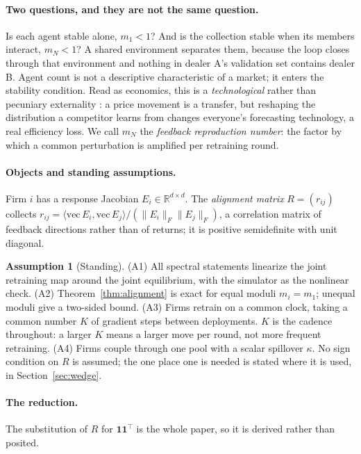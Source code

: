 \documentclass{article}
\theoremstyle{plain}
\theoremstyle{definition}
\newtheorem{assumption}{Assumption}
\newcommand{\mN}{m_N}
\begin{document}
\paragraph{Two questions, and they are not the same question.}
Is each agent stable alone, $m_1 < 1$? And is the collection stable when its members interact, $\mN < 1$? A shared environment separates them, because the loop closes through that environment and nothing in dealer A's validation set contains dealer B. Agent count is not a descriptive characteristic of a market; it enters the stability condition. Read as economics, this is a \emph{technological} rather than pecuniary externality \citep{buchanan1962}: a price movement is a transfer, but reshaping the distribution a competitor learns from changes everyone's forecasting technology, a real efficiency loss. We call $\mN$ the \emph{feedback reproduction number}: the factor by which a common perturbation is amplified per retraining round.

\paragraph{Objects and standing assumptions.}
Firm $i$ has a response Jacobian $E_i \in \mathbb{R}^{d\times d}$. The \emph{alignment matrix} $R = (r_{ij})$ collects $r_{ij} = \langle \mathrm{vec}\,E_i, \mathrm{vec}\,E_j\rangle / (\|E_i\|_F \|E_j\|_F)$, a correlation matrix of feedback directions rather than of returns; it is positive semidefinite with unit diagonal.

\begin{assumption}[Standing]
\label{ass:standing}
(A1) All spectral statements linearize the joint retraining map around the joint equilibrium, with the simulator as the nonlinear check. (A2) Theorem~\ref{thm:alignment} is exact for equal moduli $m_i = m_1$; unequal moduli give a two-sided bound. (A3) Firms retrain on a common clock, taking a common number $K$ of gradient steps between deployments. $K$ is the cadence throughout: a larger $K$ means a larger move per round, not more frequent retraining. (A4) Firms couple through one pool with a scalar spillover $\kappa$. No sign condition on $R$ is assumed; the one place one is needed is stated where it is used, in Section~\ref{sec:wedge}.
\end{assumption}

\paragraph{The reduction.}
The substitution of $R$ for $\mathbf{1}\mathbf{1}^{\top}$ is the whole paper, so it is derived rather than posited.
\end{document}
